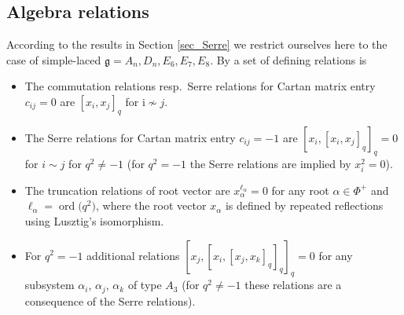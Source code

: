 \documentclass[pdftex]{sigma}%
\numberwithin{equation}{section}
\renewcommand{\i}{\mathrm{i}}
\newcommand{\g}{\mathfrak{g}}
\begin{document}
\subsection{Algebra relations}\label{CartanNArel}

According to the results in Section \ref{sec_Serre} we restrict ourselves here to the case of simple-laced $\g=A_n,D_n,E_6,E_7,E_8$. By \cite[Sections~4.1, and~4.4 and~4.5]{AA17} a set of defining relations is
\begin{itemize}\itemsep=0pt
	\item The commutation relations resp.~Serre relations for Cartan matrix entry $c_{ij}=0$ are $[x_i,x_j]_q$ for $\i\not\sim j$.
	\item The Serre relations for Cartan matrix entry $c_{ij}=-1$ are $[x_i,[x_i,x_j]_q]_q=0$ for $i\sim j$ for $q^2\neq -1$ (for $q^2=-1$ the Serre relations are implied by $x_i^2=0$).
	\item The truncation relations of root vector are $x_\alpha^{\ell_\alpha}=0$ for any root $\alpha\in\Phi^+$ and $\ell_\alpha=\operatorname{ord}\big(q^{2}\big)$, where the root vector $x_\alpha$ is defined by repeated reflections using Lusztig's isomorphism.
	\item For $q^2=-1$ additional relations $[x_j,[x_i,[x_j,x_k]_q]_q]_q=0$ for any subsystem $\alpha_i$, $\alpha_j$, $\alpha_k$ of type $A_3$ (for $q^2\neq -1$ these relations are a consequence of the Serre relations).
\end{itemize}
\end{document}
